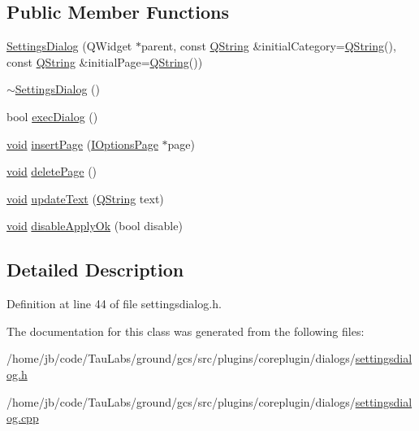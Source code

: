 \subsection*{\-Public \-Member \-Functions}
\begin{DoxyCompactItemize}
\item 
\hyperlink{group___core_plugin_ga15d13d2725ef5ddc0ab97577109c1cfe}{\-Settings\-Dialog} (\-Q\-Widget $\ast$parent, const \hyperlink{group___u_a_v_objects_plugin_gab9d252f49c333c94a72f97ce3105a32d}{\-Q\-String} \&initial\-Category=\hyperlink{group___u_a_v_objects_plugin_gab9d252f49c333c94a72f97ce3105a32d}{\-Q\-String}(), const \hyperlink{group___u_a_v_objects_plugin_gab9d252f49c333c94a72f97ce3105a32d}{\-Q\-String} \&initial\-Page=\hyperlink{group___u_a_v_objects_plugin_gab9d252f49c333c94a72f97ce3105a32d}{\-Q\-String}())
\item 
\hyperlink{group___core_plugin_gac48f54d4472902be0a3845a69167f068}{$\sim$\-Settings\-Dialog} ()
\item 
bool \hyperlink{group___core_plugin_ga39aeb933e3a9148592563c484cbce0cb}{exec\-Dialog} ()
\item 
\hyperlink{group___u_a_v_objects_plugin_ga444cf2ff3f0ecbe028adce838d373f5c}{void} \hyperlink{group___core_plugin_gaac5454d19f41ea69a14868db50b1622b}{insert\-Page} (\hyperlink{class_core_1_1_i_options_page}{\-I\-Options\-Page} $\ast$page)
\item 
\hyperlink{group___u_a_v_objects_plugin_ga444cf2ff3f0ecbe028adce838d373f5c}{void} \hyperlink{group___core_plugin_ga793f737602119510b036427f3d34929f}{delete\-Page} ()
\item 
\hyperlink{group___u_a_v_objects_plugin_ga444cf2ff3f0ecbe028adce838d373f5c}{void} \hyperlink{group___core_plugin_ga1724de2aa0c997d8556d99509e5bef87}{update\-Text} (\hyperlink{group___u_a_v_objects_plugin_gab9d252f49c333c94a72f97ce3105a32d}{\-Q\-String} text)
\item 
\hyperlink{group___u_a_v_objects_plugin_ga444cf2ff3f0ecbe028adce838d373f5c}{void} \hyperlink{group___core_plugin_ga4b64e9e3302318997b8e274874419a08}{disable\-Apply\-Ok} (bool disable)
\end{DoxyCompactItemize}


\subsection{\-Detailed \-Description}


\-Definition at line 44 of file settingsdialog.\-h.



\-The documentation for this class was generated from the following files\-:\begin{DoxyCompactItemize}
\item 
/home/jb/code/\-Tau\-Labs/ground/gcs/src/plugins/coreplugin/dialogs/\hyperlink{settingsdialog_8h}{settingsdialog.\-h}\item 
/home/jb/code/\-Tau\-Labs/ground/gcs/src/plugins/coreplugin/dialogs/\hyperlink{settingsdialog_8cpp}{settingsdialog.\-cpp}\end{DoxyCompactItemize}
